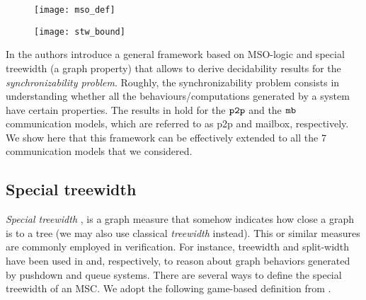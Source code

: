 
\begin{figure}[ht]
	\begin{center}
	\texttt{[image: mso\_def]}
	\end{center}
\end{figure}

\begin{figure}[ht]
	\begin{center}
	\texttt{[image: stw\_bound]}
	\end{center}
\end{figure}

In \cite{BolligFG21} the authors introduce a general framework based on MSO-logic and special treewidth (a graph property) that allows to derive decidability results for the \emph{synchronizability problem}. Roughly, the synchronizability problem consists in understanding whether all the behaviours/computations generated by a system have certain properties. The results in \cite{BolligFG21} hold for the $\mathtt{p2p}$ and the $\mathtt{mb}$ communication models, which are referred to as p2p and mailbox, respectively. We show here that this framework can be effectively extended to all the 7 communication models that we considered. 

\subsection{Special treewidth}

\emph{Special treewidth} \cite{Courcelle10},
is a graph measure that somehow indicates how close
a graph is to a tree (we may also use classical \emph{treewidth} instead).
This or similar measures are commonly employed in verification. For instance, treewidth and split-width have been used in \cite{MadhusudanP11} and, respectively, \cite{DBLP:conf/concur/CyriacGK12,AiswaryaGK14} to reason about graph behaviors generated by pushdown and queue systems.
There are several ways to define the special treewidth of an MSC.
We adopt the following game-based definition from \cite{DBLP:journals/corr/abs-1904-06942}.

